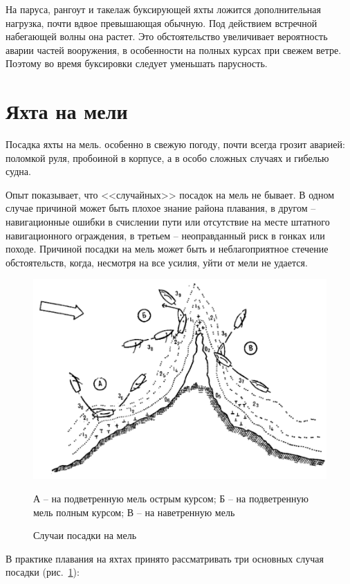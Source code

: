 \documentclass[a4paper, 12pt, twoside, final]{scrbook}
\begin{document}
На паруса, рангоут и такелаж буксирующей яхты ложится дополнительная нагрузка, почти вдвое превышающая обычную. Под действием встречной набегающей волны она растет. Это обстоятельство увеличивает вероятность аварии частей вооружения, в особенности на полных курсах при свежем ветре. Поэтому во время буксировки следует уменьшать парусность.

\section{Яхта на мели}

Посадка яхты на мель. особенно в свежую погоду, почти всегда грозит аварией: поломкой руля, пробоиной в корпусе, а в особо сложных случаях и гибелью судна.

Опыт показывает, что <<случайных>> посадок на мель не бывает. В одном случае причиной может быть плохое знание района плавания, в другом \--- навигационные ошибки в счислении пути или отсутствие на месте штатного навигационного ограждения, в третьем \--- неоправданный риск в гонках или походе. Причиной посадки на мель может быть и неблагоприятное стечение обстоятельств, когда, несмотря на все усилия, уйти от мели не удается.

\begin{figure}[htbp]
   \centering
   \includegraphics{pics/138_Posadka_na_mel} %
   \caption{Случаи посадки на мель}
   \label{fig:138}
   \centering\small
   А \--- на подветренную мель острым курсом; Б \--- на подветренную мель полным курсом; В \--- на наветренную мель
\end{figure}

В практике плавания на яхтах принято рассматривать три основных случая посадки (рис.~\ref{fig:138}):
\end{document}
